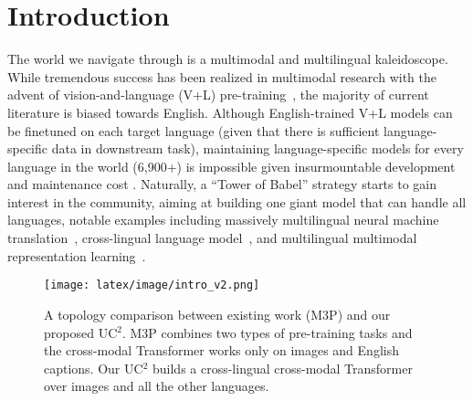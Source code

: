 \documentclass[final]{cvpr}
\newcommand{\jj}[1]{\textcolor{red}{\small{\bf [JJ: #1 ]}}}
\newcommand{\ucabbrns}{\textsc{UC$^2$}}
\begin{document}
\section{Introduction}
The world we navigate through is a multimodal and multilingual kaleidoscope. While tremendous success has been realized in multimodal research with the advent of vision-and-language (V+L) pre-training~\cite{UNITER,OSCAR,vilbert,tan2019lxmert, huang2020pixelbert}, the majority of current literature is biased towards English. Although English-trained V+L models can be finetuned on each target language (given that there is sufficient language-specific data in downstream task), maintaining language-specific models for every language in the world (6,900+) is impossible given insurmountable development and maintenance cost \cite{hu2020xtreme}. 
Naturally, a ``Tower of Babel'' strategy starts to gain interest in the community, aiming at building one giant model that can handle all languages, notable examples including massively multilingual neural machine translation~\cite{aharoni2019massively}, cross-lingual language model~\cite{lample2019cross}, and multilingual multimodal representation learning~\cite{gella2017image,huang2020m3p}.

\begin{figure}[t!]
\centering
\texttt{[image: latex/image/intro\_v2.png]}
  \caption{ A topology comparison between existing work (M3P) and our proposed \ucabbrns. %
  M3P combines two types of pre-training tasks and the cross-modal Transformer works only on images and English captions. Our UC$^2$ builds a cross-lingual cross-modal Transformer over images and all the other languages.
  }
\label{fig:comp}
\end{figure}
\end{document}
